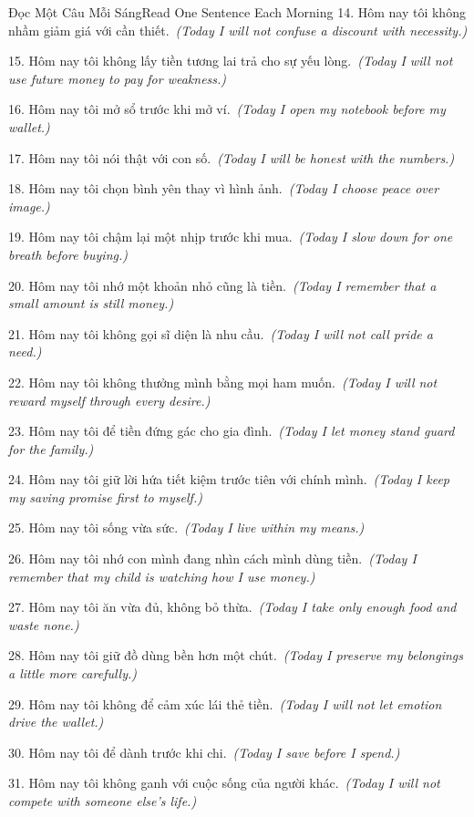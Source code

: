 \begin{truyen}{Đọc Một Câu Mỗi Sáng}{Read One Sentence Each Morning}
14. Hôm nay tôi không nhầm giảm giá với cần thiết.\
\textit{(Today I will not confuse a discount with necessity.)}

15. Hôm nay tôi không lấy tiền tương lai trả cho sự yếu lòng.\
\textit{(Today I will not use future money to pay for weakness.)}

16. Hôm nay tôi mở sổ trước khi mở ví.\
\textit{(Today I open my notebook before my wallet.)}

17. Hôm nay tôi nói thật với con số.\
\textit{(Today I will be honest with the numbers.)}

18. Hôm nay tôi chọn bình yên thay vì hình ảnh.\
\textit{(Today I choose peace over image.)}

19. Hôm nay tôi chậm lại một nhịp trước khi mua.\
\textit{(Today I slow down for one breath before buying.)}

20. Hôm nay tôi nhớ một khoản nhỏ cũng là tiền.\
\textit{(Today I remember that a small amount is still money.)}

21. Hôm nay tôi không gọi sĩ diện là nhu cầu.\
\textit{(Today I will not call pride a need.)}

22. Hôm nay tôi không thưởng mình bằng mọi ham muốn.\
\textit{(Today I will not reward myself through every desire.)}

23. Hôm nay tôi để tiền đứng gác cho gia đình.\
\textit{(Today I let money stand guard for the family.)}

24. Hôm nay tôi giữ lời hứa tiết kiệm trước tiên với chính mình.\
\textit{(Today I keep my saving promise first to myself.)}

25. Hôm nay tôi sống vừa sức.\
\textit{(Today I live within my means.)}

26. Hôm nay tôi nhớ con mình đang nhìn cách mình dùng tiền.\
\textit{(Today I remember that my child is watching how I use money.)}

27. Hôm nay tôi ăn vừa đủ, không bỏ thừa.\
\textit{(Today I take only enough food and waste none.)}

28. Hôm nay tôi giữ đồ dùng bền hơn một chút.\
\textit{(Today I preserve my belongings a little more carefully.)}

29. Hôm nay tôi không để cảm xúc lái thẻ tiền.\
\textit{(Today I will not let emotion drive the wallet.)}

30. Hôm nay tôi để dành trước khi chi.\
\textit{(Today I save before I spend.)}

31. Hôm nay tôi không ganh với cuộc sống của người khác.\
\textit{(Today I will not compete with someone else’s life.)}


\end{truyen}
